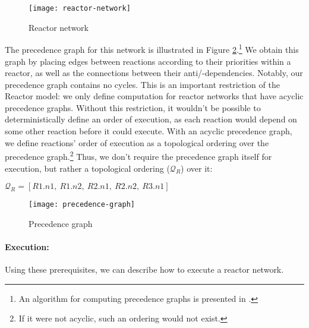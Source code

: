 \begin{figure}[!h]
\centering
\texttt{[image: reactor-network]}
\caption{Reactor network}
\label{fig:reactor-network}
\end{figure}

\noindent The precedence graph for this network is illustrated in Figure \ref{fig:precedence-graph}.\footnote{
    An algorithm for computing precedence graphs is presented in \cite{cyphy}.
}
We obtain this graph by placing edges between reactions according to their priorities within a reactor, as well as the connections between their anti/-dependencies.
Notably, our precedence graph contains no cycles.
This is an important restriction of the Reactor model: we only define computation for reactor networks that have acyclic precedence graphs.
Without this restriction, it wouldn't be possible to deterministically define an order of execution, as each reaction would depend on some other reaction before it could execute.
With an acyclic precedence graph, we define reactions' order of execution as a topological ordering over the precedence graph.\footnote{
    If it were not acyclic, such an ordering would not exist.
}
Thus, we don't require the precedence graph itself for execution, but rather a topological ordering ($\mathcal{Q}_R$) over it:

\vspace{2mm}
$\mathcal{Q}_R = [R1.n1,\ R1.n2,\ R2.n1,\ R2.n2,\ R3.n1]$
\vspace{2mm}

\begin{figure}[!h]
\centering
\texttt{[image: precedence-graph]}
\caption{Precedence graph}
\label{fig:precedence-graph}
\end{figure}

\paragraph{Execution:}
\label{section:execution-model-steps}

Using these prerequisites, we can describe how to execute a reactor network.

